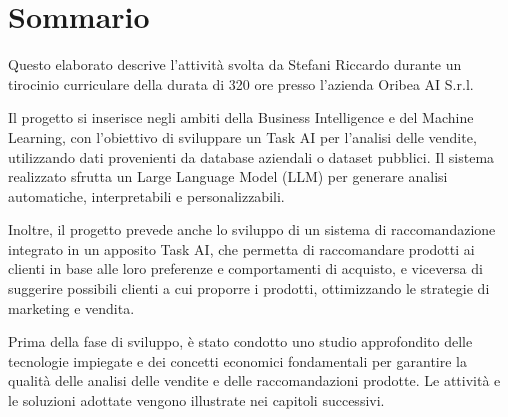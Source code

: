 \cleardoublepage
{}
{}
\begingroup
\let\clearpage\relax
\let\cleardoublepage\relax
\let\cleardoublepage\relax

\chapter*{Sommario}

Questo elaborato descrive l’attività svolta da Stefani Riccardo durante un tirocinio curriculare della durata di 320 ore presso l’azienda Oribea AI S.r.l.

Il progetto si inserisce negli ambiti della Business Intelligence e del Machine Learning, con l'obiettivo di sviluppare un Task AI per l'analisi delle vendite, utilizzando dati provenienti da database aziendali o dataset pubblici. Il sistema realizzato sfrutta un Large Language Model (LLM) per generare analisi automatiche, interpretabili e personalizzabili.

Inoltre, il progetto prevede anche lo sviluppo di un sistema di raccomandazione integrato in un apposito Task AI, che permetta di raccomandare prodotti ai clienti in base alle loro preferenze e comportamenti di acquisto, e viceversa di suggerire possibili clienti a cui proporre i prodotti, ottimizzando le strategie di marketing e vendita.

Prima della fase di sviluppo, è stato condotto uno studio approfondito delle tecnologie impiegate e dei concetti economici fondamentali per garantire la qualità delle analisi delle vendite e delle raccomandazioni prodotte. Le attività e le soluzioni adottate vengono illustrate nei capitoli successivi.




\endgroup

\vfill
